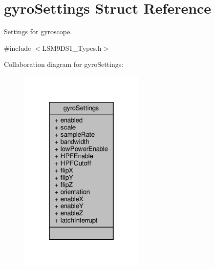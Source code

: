 \hypertarget{structgyroSettings}{}\section{gyro\+Settings Struct Reference}
\label{structgyroSettings}


Settings for gyroscope.  




{\ttfamily \#include $<$L\+S\+M9\+D\+S1\+\_\+\+Types.\+h$>$}



Collaboration diagram for gyro\+Settings\+:\nopagebreak
\begin{figure}[H]
\begin{center}
\leavevmode
\includegraphics[width=178pt]{structgyroSettings__coll__graph}
\end{center}
\end{figure}
